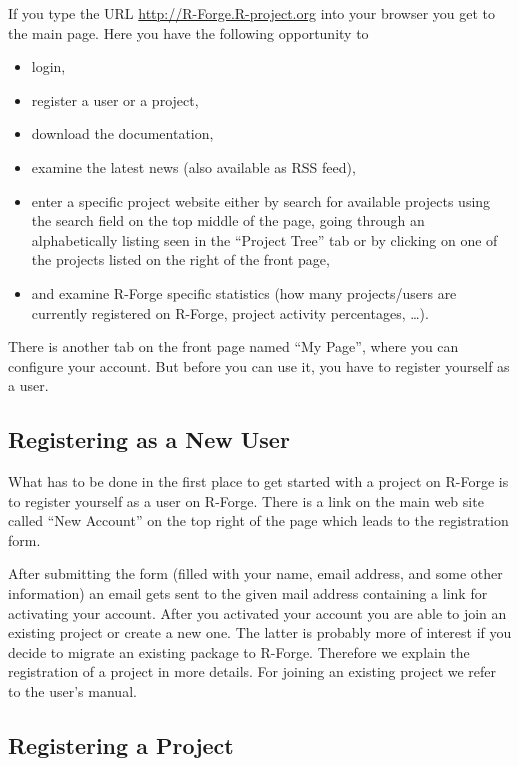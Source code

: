 If you type the URL \url{http://R-Forge.R-project.org} into your
browser you get to the main page. Here you have the following
opportunity to
\begin{itemize}
\item login,
\item register a user or a project,
\item download the documentation,
\item examine the latest news (also available as RSS feed),
\item enter a specific project website either by search for available
  projects using the search field on the top middle of the page, going
  through an alphabetically listing seen in the
  ``Project Tree'' tab or by clicking on one of the projects listed on
  the right of the front page,
\item and examine R-Forge specific statistics (how many projects/users
  are currently registered on R-Forge, project activity percentages,
  \ldots{}).
\end{itemize}

There is another tab on the front page named ``My Page'', where you
can configure your account. But before you can use it, you have to
register yourself as a user.

\subsection{Registering as a New User}

What has to be done in the first place to get started with a project
on R-Forge is to register yourself as a user on R-Forge. There is a link on
the main web site called ``New Account'' on the top right of the page
which leads to the registration form.

After submitting the form (filled with your name, email address, and
some other information) an email gets sent to the given mail
address containing a link for activating your account. After you
activated your account you are able to join an existing project or
create a new one.
The latter is probably more of interest if you decide to migrate an
existing package to R-Forge. Therefore we explain the registration 
of a project in more details. For joining an existing project we refer
to the user's manual.

\subsection{Registering a Project}

